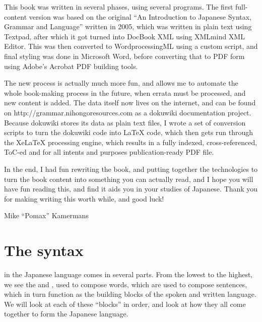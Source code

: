 \documentclass[11pt, b5paper, twoside, openright, onecolumn]{book}
\begin{document}
This book was written in several phases‚ using several programs. The first full-content version was based on the original “An Introduction to Japanese Syntax‚ Grammar and Language” written in 2005‚ which was written in plain text using Textpad‚ after which it got turned into DocBook XML using XMLmind XML Editor. This was then converted to WordprocessingML using a custom script‚ and final styling was done in Microsoft Word‚ before converting that to PDF form using Adobe’s Acrobat PDF building tools.

The new process is actually much more fun‚ and allows me to automate the whole book-making process in the future‚ when errata must be processed‚ and new content is added. The data itself now lives on the internet‚ and can be found on http://grammar.nihongoresources.com as a dokuwiki documentation project. Because dokuwiki stores its data as plain text files‚ I wrote a set of conversion scripts to turn the dokuwiki code into LaTeX code‚ which then gets run through the XeLaTeX processing engine‚ which results in a fully indexed‚ cross-referenced‚ ToC-ed and for all intents and purposes publication-ready PDF file. 

In the end‚ I had fun rewriting the book‚ and putting together the technologies to turn the book content into something you can actually read‚ and I hope you will have fun reading this‚ and find it aids you in your studies of Japanese. Thank you for making writing this worth while‚ and good luck!

\vspace{2em}

Mike “Pomax” Kamermans

	\mainmatter

	\pagestyle{fancy}

	\renewcommand{\chaptermark}[1]{\markboth{#1}{}}
	\renewcommand{\sectionmark}[1]{\markright{\thesection\ #1}}


\chapter{The syntax}

 in the Japanese language comes in several parts. From the lowest to the highest‚ we see the  and ‚ used to compose words‚ which are used to compose sentences‚ which in turn function as the building blocks of the spoken and written language. We will look at each of these “blocks” in order‚ and look at how they all come together to form the Japanese language.
\end{document}
